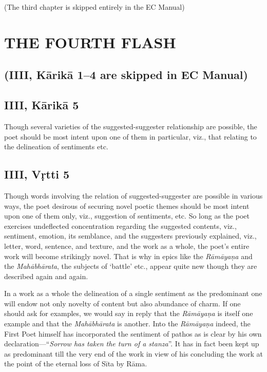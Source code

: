 \documentclass[12pt]{book}
\begin{document}
(The third chapter is skipped entirely in the EC Manual)



\chapter{THE FOURTH FLASH}


\section{(IIII, Kārikā 1--4 are skipped in EC Manual)}

\section{IIII, Kārikā 5}

Though several varieties of the suggested-suggester relationship are possible, the poet should be most intent upon one of
them in particular, viz., that relating to the delineation of
sentiments etc.

\section{IIII, Vṛtti 5}

Though words involving the relation of suggested-suggester
are possible in various ways, the poet desirous of securing novel
poetic themes should be most intent upon one of them only,
viz., suggestion of sentiments, etc. So long as the poet exercises
undeflected concentration regarding the suggested contents, viz.,
sentiment, emotion, its semblance, and the suggesters previously
explained, viz., letter, word, sentence, and texture, and the work
as a whole, the poet's entire work will become strikingly novel.
That is why in epics like the \textit{Rāmāyaṇa} and the \textit{Mahābhārata},
the subjects of `battle' etc., appear quite new though they are
described again and again.

In a work as a whole the delineation of a single sentiment
as the predominant one will endow not only novelty of content
but also abundance of charm. If one should ask for examples,
we would say in reply that the \textit{Rāmāyaṇa} is itself one example
and that the \textit{Mahābhārata} is another. Into the \textit{Rāmāyaṇa} indeed,
the First Poet himself has incorporated the sentiment of pathos
as is clear by his own declaration---``\textit{Sorrow has taken the turn
of a stanza}''. It has in fact been kept up as predominant till
the very end of the work in view of his concluding the work
at the point of the eternal loss of Sīta by Rāma.
\end{document}
